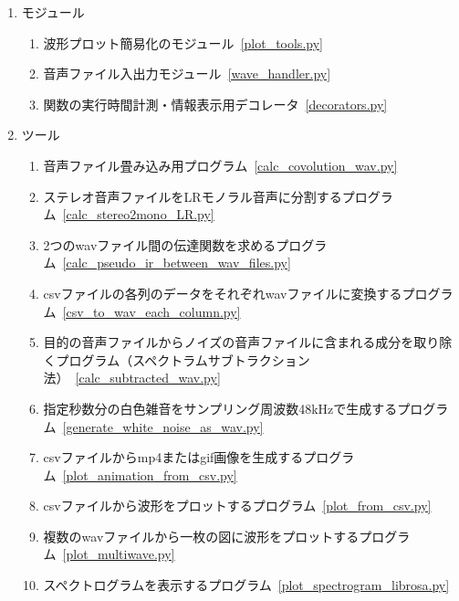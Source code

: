\begin{enumerate}
\renewcommand{\labelenumi}{(\arabic{enumi})}
\item
  モジュール

  \begin{enumerate}
  \renewcommand{\labelenumi}{(\arabic{enumi})}
  \item
    波形プロット簡易化のモジュール\ \ref{plot_tools.py}

  \item
    音声ファイル入出力モジュール\  \ref{wave_handler.py}

  \item
    関数の実行時間計測・情報表示用デコレータ\ \ref{decorators.py}

  \end{enumerate}

\item
  ツール

  \begin{enumerate}
  \renewcommand{\labelenumi}{(\arabic{enumi})}
  \item
    音声ファイル畳み込み用プログラム\ \ref{calc_covolution_wav.py}

  \item
    ステレオ音声ファイルをLRモノラル音声に分割するプログラム\ \ref{calc_stereo2mono_LR.py}

  \item
    2つのwavファイル間の伝達関数を求めるプログラム\ \ref{calc_pseudo_ir_between_wav_files.py}

  \item
    csvファイルの各列のデータをそれぞれwavファイルに変換するプログラム\ \ref{csv_to_wav_each_column.py}

  \item
    目的の音声ファイルからノイズの音声ファイルに含まれる成分を取り除くプログラム（スペクトラムサブトラクション法）\ \ref{calc_subtracted_wav.py}

  \item
    指定秒数分の白色雑音をサンプリング周波数48kHzで生成するプログラム\ \ref{generate_white_noise_as_wav.py}

  \item
    csvファイルからmp4またはgif画像を生成するプログラム\ \ref{plot_animation_from_csv.py}

  \item
    csvファイルから波形をプロットするプログラム\ \ref{plot_from_csv.py}

  \item
    複数のwavファイルから一枚の図に波形をプロットするプログラム\ \ref{plot_multiwave.py}

  \item
    スペクトログラムを表示するプログラム\ \ref{plot_spectrogram_librosa.py}

  \end{enumerate}
\end{enumerate}

